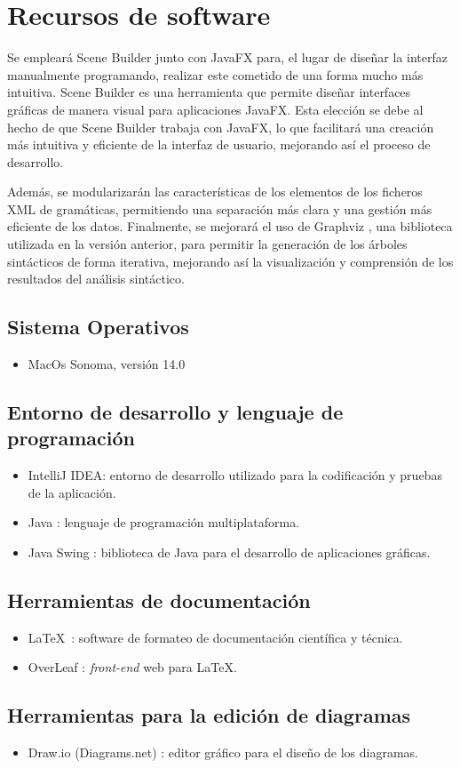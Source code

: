 \section{Recursos de software}
Se empleará Scene Builder \cite{scenebuilder} junto con JavaFX \cite{javafx} para, el lugar de diseñar la interfaz manualmente programando, realizar este cometido de una forma mucho más intuitiva. Scene Builder es una herramienta que permite diseñar interfaces gráficas de manera visual para aplicaciones JavaFX. Esta elección se debe al hecho de que Scene Builder trabaja con JavaFX, lo que facilitará una creación más intuitiva y eficiente de la interfaz de usuario, mejorando así el proceso de desarrollo.

Además, se modularizarán las características de los elementos de los ficheros XML de gramáticas, permitiendo una separación más clara y una gestión más eficiente de los datos. Finalmente, se mejorará el uso de Graphviz \cite{graphviz}, una biblioteca utilizada en la versión anterior, para permitir la generación de los árboles sintácticos de forma iterativa, mejorando así la visualización y comprensión de los resultados del análisis sintáctico.

 \subsection{Sistema Operativos}
 \begin{itemize}
      \item MacOs Sonoma, versión 14.0
  \end{itemize}

 
  \subsection{Entorno de desarrollo y lenguaje de programación}
  \begin{itemize}
      \item IntelliJ IDEA\cite{intellij}: entorno de desarrollo utilizado para la codificación y pruebas de la aplicación.
      \item Java \cite{java}: lenguaje de programación multiplataforma.
      \item Java Swing \cite{javaswing}: biblioteca de Java para el desarrollo de aplicaciones gráficas.
  \end{itemize}

 \subsection{Herramientas de documentación}
  \begin{itemize}
      \item \LaTeX \ \cite{latex}: software de formateo de documentación científica y técnica.
      \item OverLeaf \cite{overleaf}: \textit{front-end} web para \LaTeX.
  \end{itemize}

  \subsection{Herramientas para la edición de diagramas}
  \begin{itemize}
      \item Draw.io (Diagrams.net) \cite{drawio}: editor gráfico para el diseño de los diagramas.
  \end{itemize}

